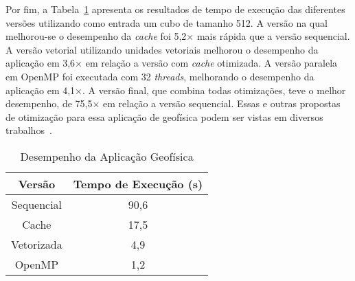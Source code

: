 Por fim, a Tabela~\ref{tab:results} apresenta os resultados de tempo de execução das diferentes versões utilizando como entrada um cubo de tamanho 512. A versão na qual melhorou-se o desempenho da \textit{cache} foi 5,2$\times$ mais rápida que a versão sequencial. A versão vetorial utilizando unidades vetoriais melhorou o desempenho da aplicação em 3,6$\times$ em relação a versão com \textit{cache} otimizada. A versão paralela em OpenMP foi executada com 32 \textit{threads}, melhorando o desempenho da aplicação em 4,1$\times$. A versão final, que combina todas otimizações, teve o melhor desempenho, de 75,5$\times$ em relação a versão sequencial. Essas e outras propostas de otimização para essa aplicação de geofísica podem ser vistas em diversos trabalhos~\cite{serpa2017strategies, serpa2018optimizing, serpa2018improving, serpa2019optimization}.

\begin{table}[!htb]
\centering
\caption{Desempenho da Aplicação Geofísica}
\label{tab:results}
\begin{tabular}{cc}
\toprule
Versão     & Tempo de Execução (s)   \\ \midrule
Sequencial & 90,6                    \\ 
Cache      & 17,5                    \\ 
Vetorizada &  4,9                    \\ 
OpenMP     &  1,2                    \\ \bottomrule
\end{tabular}
\end{table}